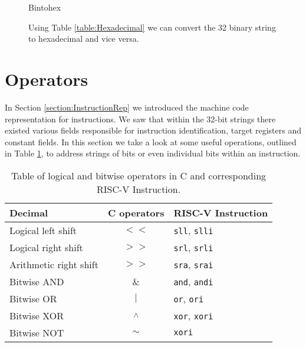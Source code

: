             \begin{figure}[h!]
                \centering
                {Bintohex}
                \caption{Using Table \ref{table:Hexadecimal} we can convert the 32 binary string to hexadecimal and vice versa.}
                \label{fig:bintohex}
            \end{figure}
       
\section{Operators}\label{section:Operators}
    In Section \ref{section:InstructionRep} we introduced the machine code representation for instructions. We saw that within the 32-bit strings there existed various fields responsible for instruction identification, target registers and constant fields.
    In this section we take a look at some useful operations, outlined in Table \ref{table:operators}, to address strings of bits or even individual bits within an instruction.
    
    \begin{table}[h!]
        \centering
        \begin{tabular}{|l|c|l|}
        	\hline
        	Decimal                & C operators                & RISC-V Instruction          \\ \hline
        	Logical left shift     & $<<$                      & \texttt{sll}, \texttt{slli} \\ \hline
        	Logical right shift    & $>>$                      & \texttt{srl}, \texttt{srli} \\ \hline
        	Arithmetic right shift & $>>$                      & \texttt{sra}, \texttt{srai} \\ \hline
        	Bitwise AND            & \&                         & \texttt{and}, \texttt{andi} \\ \hline
        	Bitwise OR             & $\mid$                     & \texttt{or}, \texttt{ori}   \\ \hline
        	Bitwise XOR            & \textsuperscript{$\wedge$} & \texttt{xor}, \texttt{xori} \\ \hline
        	Bitwise NOT            & $\sim$                     & \texttt{xori}               \\ \hline
        \end{tabular}
        \caption{Table of logical and bitwise operators in C and corresponding RISC-V Instruction.}
        \label{table:operators}
    \end{table}
    
